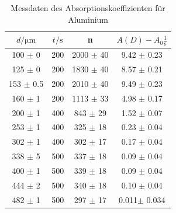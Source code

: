 \begin{table}
    \centering
    \caption{Messdaten des Absorptionskoeffizienten für Aluminium}
    \label{tab:md3alu}
    \begin{tabular}{c c c c}
        \toprule
        $d / \unit{\micro\meter}$ &  $t / \unit\second$ &     n & $A(D) - A_0 \frac{1}{\unit\second}$\\
        \midrule
                100 $\pm$ 0&    200 &   2000  $\pm$  40 &   9.42 $\pm$ 0.23 \\
                125 $\pm$ 0&    200 &   1830  $\pm$  40 &   8.57 $\pm$ 0.21 \\
                153 $\pm$ 0.5&    200 &   2010  $\pm$  40 &   9.49 $\pm$ 0.23 \\
                160 $\pm$ 1&    200 & 1113 $\pm$ 33 &   4.98 $\pm$ 0.17 \\
                200 $\pm$ 1&    400 &  843 $\pm$ 29 &   1.52 $\pm$ 0.07 \\
                253 $\pm$ 1&    400 &  325 $\pm$ 18 &   0.23 $\pm$ 0.04 \\
                302 $\pm$ 1&    400 &  302 $\pm$ 17 &   0.17 $\pm$ 0.04 \\
                338 $\pm$ 5&    500 &  337 $\pm$ 18 &   0.09 $\pm$ 0.04 \\
                400 $\pm$ 1&    500 &  339 $\pm$ 18 &   0.09 $\pm$ 0.04 \\
                444 $\pm$ 2&    500 &  340 $\pm$ 18 &   0.10 $\pm$ 0.04 \\
                482 $\pm$ 1&    500 &  297 $\pm$ 17 &   0.011$\pm$ 0.034\\
        \bottomrule
    \end{tabular}
\end{table}